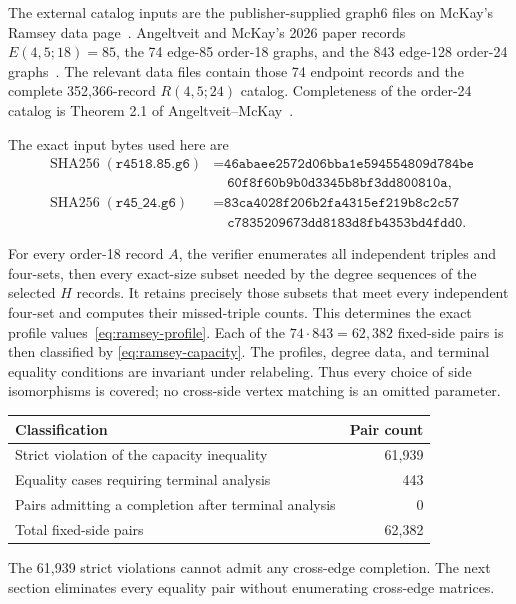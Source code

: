 \documentclass[11pt]{article}
\begin{document}
The external catalog inputs are the publisher-supplied graph6 files on
McKay's Ramsey data page~\cite{mckay-data}.  Angeltveit and McKay's 2026
paper records $E(4,5;18)=85$, the 74 edge-85 order-18 graphs, and the 843
edge-128 order-24 graphs~\cite{angeltveit-mckay-46}.  The relevant data files
contain those 74 endpoint records and the complete 352,366-record
$R(4,5;24)$ catalog.  Completeness of the order-24 catalog is Theorem 2.1 of
Angeltveit--McKay~\cite{angeltveit-mckay-48}.

The exact input bytes used here are
\begin{align*}
\operatorname{SHA256}(\texttt{r4518.85.g6})
 &=\texttt{46abaee2572d06bba1e594554809d784be}\\[-2pt]
 &\quad\texttt{60f8f60b9b0d3345b8bf3dd800810a},\\
\operatorname{SHA256}(\texttt{r45\_24.g6})
 &=\texttt{83ca4028f206b2fa4315ef219b8c2c57}\\[-2pt]
 &\quad\texttt{c7835209673dd8183d8fb4353bd4fdd0}.
\end{align*}

For every order-18 record $A$, the verifier enumerates all independent triples
and four-sets, then every exact-size subset needed by the degree sequences of
the selected $H$ records.  It retains precisely those subsets that meet every
independent four-set and computes their missed-triple counts.  This determines
the exact profile values~\eqref{eq:ramsey-profile}.  Each of the
$74\cdot843=62,382$ fixed-side pairs is then classified by
\eqref{eq:ramsey-capacity}.
The profiles, degree data, and terminal equality conditions are invariant
under relabeling.  Thus every choice of side isomorphisms is covered; no
cross-side vertex matching is an omitted parameter.

\begin{center}
\begin{tabular}{lr}
\toprule
Classification & Pair count\\
\midrule
Strict violation of the capacity inequality & 61,939\\
Equality cases requiring terminal analysis & 443\\
Pairs admitting a completion after terminal analysis & 0\\
\midrule
Total fixed-side pairs & 62,382\\
\bottomrule
\end{tabular}
\end{center}

The 61,939 strict violations cannot admit any cross-edge completion.  The next
section eliminates every equality pair without enumerating cross-edge
matrices.
\end{document}
